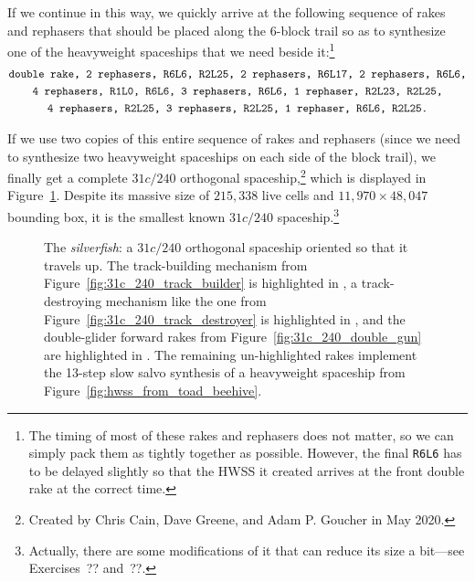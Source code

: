 If we continue in this way, we quickly arrive at the following sequence of rakes and rephasers that should be placed along the $6$-block trail so as to synthesize one of the heavyweight spaceships that we need beside it:\footnote{The timing of most of these rakes and rephasers does not matter, so we can simply pack them as tightly together as possible. However, the final \texttt{R6L6} has to be delayed slightly so that the HWSS it created arrives at the front double rake at the correct time.}
\begin{gather*}
	\text{\texttt{double rake, 2 rephasers, R6L6, R2L25, 2 rephasers, R6L17, 2 rephasers, R6L6,}} \\
	\text{\texttt{4 rephasers, R1L0, R6L6, 3 rephasers, R6L6, 1 rephaser, R2L23, R2L25,}} \\
	\text{\texttt{4 rephasers, R2L25, 3 rephasers, R2L25, 1 rephaser, R6L6, R2L25.}}
\end{gather*}

If we use two copies of this entire sequence of rakes and rephasers (since we need to synthesize two heavyweight spaceships on each side of the block trail), we finally get a complete $31c/240$ orthogonal spaceship,\footnote{Created by Chris Cain, Dave Greene, and Adam P. Goucher in May 2020.} which is displayed in Figure~\ref{fig:silverfish}. Despite its massive size of $215,338$ live cells and $11,970 \times 48,047$ bounding box, it is the smallest known $31c/240$ spaceship.\footnote{Actually, there are some modifications of it that can reduce its size a bit---see Exercises~?? and~??.}

\begin{figure}[!htbp]
	\centering
	\caption{The \emph{silverfish}: a $31c/240$ orthogonal spaceship oriented so that it travels up. The track-building mechanism from Figure~\ref{fig:31c_240_track_builder} is highlighted in , a track-destroying mechanism like the one from Figure~\ref{fig:31c_240_track_destroyer} is highlighted in , and the double-glider forward rakes from Figure~\ref{fig:31c_240_double_gun} are highlighted in . The remaining un-highlighted rakes implement the 13-step slow salvo synthesis of a heavyweight spaceship from Figure~\ref{fig:hwss_from_toad_beehive}.}\label{fig:silverfish}
\end{figure}


